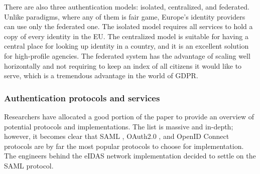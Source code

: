 There are also three authentication models: isolated, centralized, and federated. Unlike paradigms, where any of them is fair game, Europe's identity providers can use only the federated one. The isolated model requires all services to hold a copy of every identity in the EU. The centralized model is suitable for having a central place for looking up identity in a country, and it is an excellent solution for high-profile agencies. The federated system has the advantage of scaling well horizontally and not requiring to keep an index of all citizens it would like to serve, which is a tremendous advantage in the world of GDPR.

\subsubsection{Authentication protocols and services}

Researchers have allocated a good portion of the paper to provide an overview of potential protocols and implementations. The list is massive and in-depth; however, it becomes clear that SAML \cite{saml}, OAuth2.0 \cite{rfc6749}, and OpenID Connect \cite{oidc} protocols are by far the most popular protocols to choose for implementation. The engineers behind the eIDAS network implementation decided to settle on the SAML protocol.